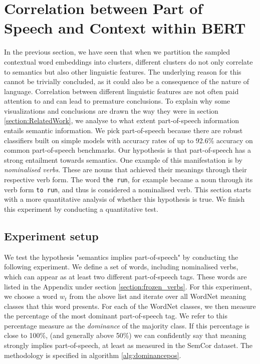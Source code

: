 \documentclass[a4paper,12pt,oneside,openright]{report}
\begin{document}
\section{Correlation between Part of Speech and Context within BERT} \label{correlation_pos_context}

In the previous section, we have seen that when we partition the sampled contextual word embeddings into clusters, different clusters do not only correlate to semantics but also other linguistic features.
The underlying reason for this cannot be trivially concluded, as it could also be a consequence of the nature of language.
Correlation between different linguistic features are not often paid attention to and can lead to premature conclusions. 
To explain why some visualizations and conclusions are drawn the way they were in section \ref{section:RelatedWork}, we analyse to what extent part-of-speech information entails semantic information.
We pick part-of-speech because there are robust classifiers built on simple models with accuracy rates of up to 92.6\% accuracy on common part-of-speech benchmarks.
Our hypothesis is that part-of-speech has a strong entailment towards semantics.
One example of this manifestation is by \textit{nominalised verbs}.
These are nouns that achieved their meanings through their respective verb form.
The word \Verb#the run#, for example became a noun through its verb form \Verb#to run#, and thus is considered a nominalised verb. 
This section starts with a more quantitative analysis of whether this hypothesis is true. 
We finish this experiment by conducting a quantitative test.

\subsection{Experiment setup}

We test the hypothesis "semantics implies part-of-speech" by conducting the following experiment.
We define a set of words, including nominalised verbs, which can appear as at least two different part-of-speech tags.
These words are listed in the Appendix under section \eqref{section:frozen_verbs}.
For this experiment, we choose a word $w_t$ from the above list and iterate over all WordNet meaning classes that this word presents.
For each of the WordNet classes, we then measure the percentage of the most dominant part-of-speech tag.
We refer to this percentage measure as the \textit{dominance} of the majority class.
If this percentage is close to 100\%, (and generally above 50\%) we can confidently say that meaning strongly implies part-of-speech, at least as measured in the SemCor dataset.
The methodology is specified in algorithm \ref{alg:dominancepos}.
\end{document}
